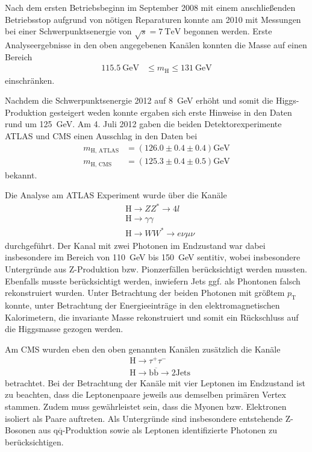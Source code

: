 Nach dem ersten Betriebsbeginn im September 2008 mit einem anschließenden Betriebsstop aufgrund von nötigen Reparaturen konnte am 2010 mit Messungen bei einer Schwerpunktsenergie von $\sqrt{s} = \SI{7}{\tera\electronvolt}$ begonnen werden.
Erste Analyseergebnisse in den oben angegebenen Kanälen konnten die Masse auf einen Bereich 
\begin{align*}
	\SI{115.5}{\giga\electronvolt} &\leq m_\text{H} \leq \SI{131}{\giga\electronvolt}
\end{align*}
einschränken.

Nachdem die Schwerpunktsenergie 2012 auf \SI{8}{\giga\electronvolt} erhöht und somit die Higgs-Produktion gesteigert weden konnte ergaben sich erste Hinweise in den Daten rund um \SI{125}{\giga\electronvolt}.
Am 4. Juli 2012 gaben die beiden Detektorexperimente ATLAS und CMS einen Ausschlag in den Daten bei
\begin{align*}
  m_{\text{H, ATLAS}} &= \left( \num{126.0} \pm \num{0.4} \pm \num{0.4} \right) \si{\giga\electronvolt} \\
  m_{\text{H, CMS}} &= \left( \num{125.3} \pm \num{0.4} \pm \num{0.5} \right) \si{\giga\electronvolt}
\end{align*}
bekannt.

Die Analyse am ATLAS Experiment wurde über die Kanäle
\begin{align*}
  &\text{H} \rightarrow Z Z^* \rightarrow 4l \\
  &\text{H} \rightarrow \gamma \gamma \\
  &\text{H} \rightarrow W W^* \rightarrow e \nu \mu \nu
\end{align*}
durchgeführt.
Der Kanal mit zwei Photonen im Endzustand war dabei insbesondere im Bereich von \SI{110}{\giga\electronvolt} bis \SI{150}{\giga\electronvolt} sentitiv, wobei insbesondere Untergründe aus Z-Produktion bzw. Pionzerfällen berücksichtigt werden mussten.
Ebenfalls musste berücksichtigt werden, inwiefern Jets ggf. als Phontonen falsch rekonstruiert wurden.
Unter Betrachtung der beiden Photonen mit größtem $p_\text{T}$ konnte, unter Betrachtung der Energieeinträge in den elektromagnetischen Kalorimetern, die invariante Masse rekonstruiert und somit ein Rückschluss auf die Higgsmasse gezogen werden.

Am CMS wurden eben den oben genannten Kanälen zusätzlich die Kanäle 
\begin{align*}
  &\text{H} \rightarrow \tau^+ \tau^- \\
  &\text{H} \rightarrow \text{b} \overline{\text{b}} \rightarrow 2 \text{Jets}
\end{align*}
betrachtet.
Bei der Betrachtung der Kanäle mit vier Leptonen im Endzustand ist zu beachten, dass die Leptonenpaare jeweils aus demselben primären Vertex stammen.
Zudem muss gewährleistet sein, dass die Myonen bzw. Elektronen isoliert als Paare auftreten.
Als Untergründe sind insbesondere entstehende Z-Bosonen aus $\text{q}\overline{\text{q}}$-Produktion sowie als Leptonen identifizierte Photonen zu berücksichtigen.


